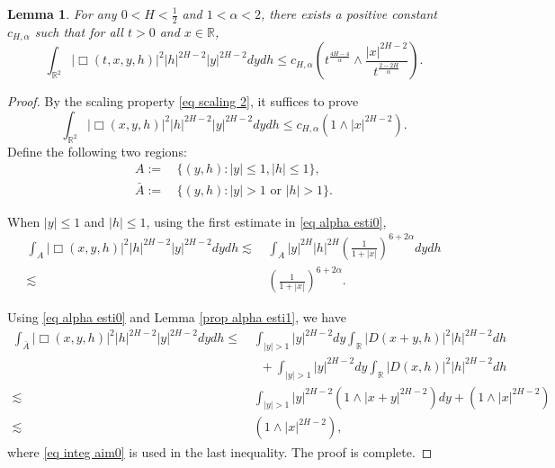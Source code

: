 \documentclass[11pt,reqno]{amsart}
\numberwithin{equation}{section}
\newtheorem{lemma}{Lemma}[section]
\newcommand{\1}{{\bf 1}}
\newcommand{\2}{{\bf 2}}
\begin{document}
\begin{lemma}\label{prop alpha esti2}
For any $0<H<\frac12$ and $1<\alpha<2$, there exists a positive constant $c_{H,\alpha}$ such that for all $t>0$ and $x\in \mathbb R$,
\begin{equation}\label{eq alpha esti2-1}
\int_{\mathbb{R}^2 }\left|\Box(t,x,y,h)\right|^2|h|^{2H-2}|y|^{2H-2}dydh\le c_{H,\alpha}\left(t^{\frac{4H-4}{\alpha}}\wedge \frac{|x|^{2H-2}}{t^{\frac{2-2H}{\alpha}}}\right).
\end{equation}
\end{lemma}
\begin{proof}
By the scaling property  \eqref{eq scaling 2}, it suffices to prove 
\begin{equation}\label{eq alpha esti2}
\int_{\mathbb{R}^2 }\left|\Box(x,y,h)\right|^2|h|^{2H-2}|y|^{2H-2}dydh\le c_{H,\alpha} \left(1\wedge |x|^{2H-2}\right).
\end{equation} 
 Define the following two regions:
\begin{align*}
A:=&\, \{(y,h): |y|\le 1,|h|\le 1\},\\
\bar A:=&\,\{(y,h): |y|> 1  \text{ or } |h|> 1\}.
\end{align*}
 
 When $|y|\le 1$ and  $|h|\le 1$,  using the first estimate in \eqref{eq alpha esti0},
\begin{align*}
\int_{A}\left|\Box(x,y,h)\right|^2|h|^{2H-2}|y|^{2H-2}dydh \lesssim &\,  \int_{A}|y|^{2H}|h|^{2H}\left(\frac{1}{1+|x|}\right)^{6+2\alpha}dydh\\
 \lesssim &\, \left(\frac{1}{1+|x|}\right)^{6+2\alpha}.
\end{align*}
 
 Using   \eqref{eq alpha esti0} and  Lemma \ref{prop alpha esti1}, we have
\begin{align*}
 \int_{\bar A}\left|\Box(x,y,h)\right|^2|h|^{2H-2}|y|^{2H-2}dydh 
\le  &\, 
 \int_{|y|>1}|y|^{2H-2}dy\int_{\mathbb R} |D(x+y,h)|^2 |h|^{2H-2}dh\\
 &\,\,\,\, +\int_{|y|>1}|y|^{2H-2}dy\int_{\mathbb R} |D(x,h)|^2 |h|^{2H-2}dh\\
\lesssim &\,  \int_{|y|>1}|y|^{2H-2} \left(1\wedge |x+y|^{2H-2}\right)dy+\left(1\wedge |x|^{2H-2}\right)\\
\lesssim &\, \left(1\wedge |x|^{2H-2}\right),
\end{align*}
 where  \eqref{eq integ aim0} is used in the last inequality.  The proof is complete. 
\end{proof}
\end{document}
